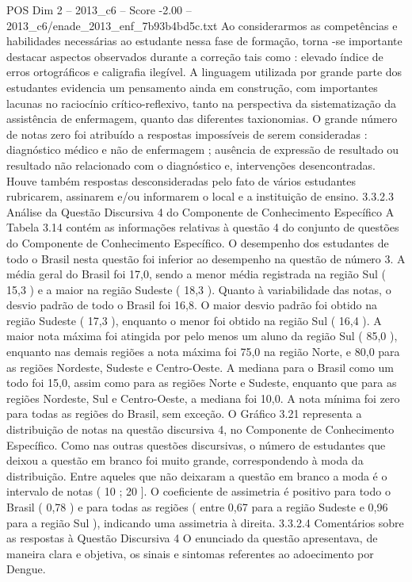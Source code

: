 \begin{textsample}{POS Dim 2 – 2013\_c6 – Score -2.00 – 2013\_c6/enade\_2013\_enf\_7b93b4bd5c.txt}
Ao considerarmos as competências e habilidades necessárias ao estudante nessa fase de formação, torna -se importante destacar aspectos observados durante a correção tais como : elevado índice de erros ortográficos e caligrafia ilegível.
A linguagem utilizada por grande parte dos estudantes evidencia um pensamento ainda em construção, com importantes lacunas no raciocínio crítico-reflexivo, tanto na perspectiva da sistematização da assistência de enfermagem, quanto das diferentes taxionomias.
O grande número de notas zero foi atribuído a respostas impossíveis de serem consideradas : diagnóstico médico e não de enfermagem ; ausência de expressão de resultado ou resultado não relacionado com o diagnóstico e, intervenções desencontradas.
Houve também respostas desconsideradas pelo fato de vários estudantes rubricarem, assinarem e/ou informarem o local e a instituição de ensino. 3.3.2.3 Análise da Questão Discursiva 4 do Componente de Conhecimento Específico A Tabela 3.14 contém as informações relativas à questão 4 do conjunto de questões do Componente de Conhecimento Específico.
O desempenho dos estudantes de todo o Brasil nesta questão foi inferior ao desempenho na questão de número 3.
A média geral do Brasil foi 17,0, sendo a menor média registrada na região Sul ( 15,3 ) e a maior na região Sudeste ( 18,3 ).
Quanto à variabilidade das notas, o desvio padrão de todo o Brasil foi 16,8.
O maior desvio padrão foi obtido na região Sudeste ( 17,3 ), enquanto o menor foi obtido na região Sul ( 16,4 ).
A maior nota máxima foi atingida por pelo menos um aluno da região Sul ( 85,0 ), enquanto nas demais regiões a nota máxima foi 75,0 na região Norte, e 80,0 para as regiões Nordeste, Sudeste e Centro-Oeste.
A mediana para o Brasil como um todo foi 15,0, assim como para as regiões Norte e Sudeste, enquanto que para as regiões Nordeste, Sul e Centro-Oeste, a mediana foi 10,0.
A nota mínima foi zero para todas as regiões do Brasil, sem exceção.
O Gráfico 3.21 representa a distribuição de notas na questão discursiva 4, no Componente de Conhecimento Específico.
Como nas outras questões discursivas, o número de estudantes que deixou a questão em branco foi muito grande, correspondendo à moda da distribuição.
Entre aqueles que não deixaram a questão em branco a moda é o intervalo de notas ( 10 ; 20 ].
O coeficiente de assimetria é positivo para todo o Brasil ( 0,78 ) e para todas as regiões ( entre 0,67 para a região Sudeste e 0,96 para a região Sul ), indicando uma assimetria à direita. 3.3.2.4 Comentários sobre as respostas à Questão Discursiva 4 O enunciado da questão apresentava, de maneira clara e objetiva, os sinais e sintomas referentes ao adoecimento por Dengue.

\end{textsample}
